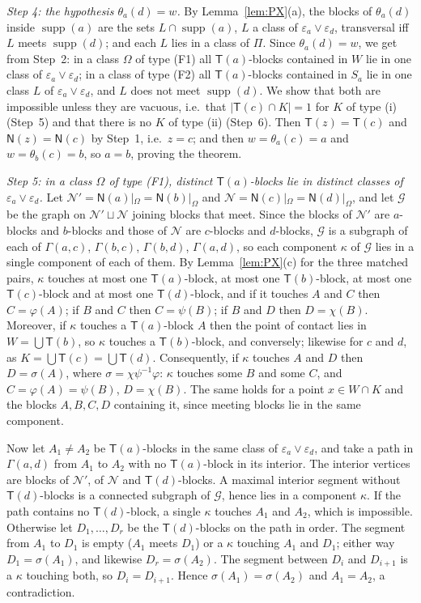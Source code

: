 \documentclass[11pt]{amsart}
\theoremstyle{definition}
\newcommand{\supp}{\operatorname{supp}}
\newcommand{\T}{\mathsf{T}}
\newcommand{\N}{\mathsf{N}}
\begin{document}
\smallskip
\emph{Step 4: the hypothesis $\theta_a(d)=w$.} By Lemma~\ref{lem:PX}(a), the blocks of $\theta_a(d)$ inside $\supp(a)$ are the sets $L\cap\supp(a)$, $L$ a class of $\varepsilon_a\vee\varepsilon_d$, transversal iff $L$ meets $\supp(d)$; and each $L$ lies in a class of $\Pi$. Since $\theta_a(d)=w$, we get from Step~2: in a class $\Omega$ of type (F1) all $\T(a)$-blocks contained in $W$ lie in one class of $\varepsilon_a\vee\varepsilon_d$; in a class of type (F2) all $\T(a)$-blocks contained in $S_a$ lie in one class $L$ of $\varepsilon_a\vee\varepsilon_d$, and $L$ does not meet $\supp(d)$. We show that both are impossible unless they are vacuous, i.e.\ that $|\T(c)\cap K|=1$ for $K$ of type (i) (Step~5) and that there is no $K$ of type (ii) (Step~6). Then $\T(z)=\T(c)$ and $\N(z)=\N(c)$ by Step~1, i.e.\ $z=c$; and then $w=\theta_a(c)=a$ and $w=\theta_b(c)=b$, so $a=b$, proving the theorem.

\smallskip
\emph{Step 5: in a class $\Omega$ of type \textup{(F1)}, distinct $\T(a)$-blocks lie in distinct classes of $\varepsilon_a\vee\varepsilon_d$.} Let $\mathcal N'=\N(a)|_\Omega=\N(b)|_\Omega$ and $\mathcal N=\N(c)|_\Omega=\N(d)|_\Omega$, and let $\mathcal G$ be the graph on $\mathcal N'\sqcup\mathcal N$ joining blocks that meet. Since the blocks of $\mathcal N'$ are $a$-blocks and $b$-blocks and those of $\mathcal N$ are $c$-blocks and $d$-blocks, $\mathcal G$ is a subgraph of each of $\Gamma(a,c)$, $\Gamma(b,c)$, $\Gamma(b,d)$, $\Gamma(a,d)$, so each component $\kappa$ of $\mathcal G$ lies in a single component of each of them. By Lemma~\ref{lem:PX}(c) for the three matched pairs, $\kappa$ touches at most one $\T(a)$-block, at most one $\T(b)$-block, at most one $\T(c)$-block and at most one $\T(d)$-block, and if it touches $A$ and $C$ then $C=\varphi(A)$; if $B$ and $C$ then $C=\psi(B)$; if $B$ and $D$ then $D=\chi(B)$. Moreover, if $\kappa$ touches a $\T(a)$-block $A$ then the point of contact lies in $W=\bigcup\T(b)$, so $\kappa$ touches a $\T(b)$-block, and conversely; likewise for $c$ and $d$, as $K=\bigcup\T(c)=\bigcup\T(d)$. Consequently, if $\kappa$ touches $A$ and $D$ then $D=\sigma(A)$, where $\sigma=\chi\psi^{-1}\varphi$: $\kappa$ touches some $B$ and some $C$, and $C=\varphi(A)=\psi(B)$, $D=\chi(B)$. The same holds for a point $x\in W\cap K$ and the blocks $A,B,C,D$ containing it, since meeting blocks lie in the same component.

Now let $A_1\ne A_2$ be $\T(a)$-blocks in the same class of $\varepsilon_a\vee\varepsilon_d$, and take a path in $\Gamma(a,d)$ from $A_1$ to $A_2$ with no $\T(a)$-block in its interior. The interior vertices are blocks of $\mathcal N'$, of $\mathcal N$ and $\T(d)$-blocks. A maximal interior segment without $\T(d)$-blocks is a connected subgraph of $\mathcal G$, hence lies in a component $\kappa$. If the path contains no $\T(d)$-block, a single $\kappa$ touches $A_1$ and $A_2$, which is impossible. Otherwise let $D_1,\dots,D_r$ be the $\T(d)$-blocks on the path in order. The segment from $A_1$ to $D_1$ is empty ($A_1$ meets $D_1$) or a $\kappa$ touching $A_1$ and $D_1$; either way $D_1=\sigma(A_1)$, and likewise $D_r=\sigma(A_2)$. The segment between $D_i$ and $D_{i+1}$ is a $\kappa$ touching both, so $D_i=D_{i+1}$. Hence $\sigma(A_1)=\sigma(A_2)$ and $A_1=A_2$, a contradiction.
\end{document}
